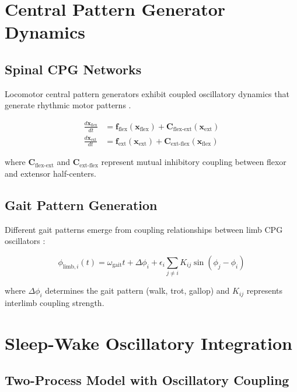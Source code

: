 \documentclass[twocolumn]{article}
\begin{document}
\section{Central Pattern Generator Dynamics}

\subsection{Spinal CPG Networks}

Locomotor central pattern generators exhibit coupled oscillatory dynamics that generate rhythmic motor patterns \citep{grillner2003central,kiehn2016decoding}.

\begin{align}
\frac{d\mathbf{x}_{\text{flex}}}{dt} &= \mathbf{f}_{\text{flex}}(\mathbf{x}_{\text{flex}}) + \mathbf{C}_{\text{flex-ext}}(\mathbf{x}_{\text{ext}}) \label{eq:flexor_cpg} \\
\frac{d\mathbf{x}_{\text{ext}}}{dt} &= \mathbf{f}_{\text{ext}}(\mathbf{x}_{\text{ext}}) + \mathbf{C}_{\text{ext-flex}}(\mathbf{x}_{\text{flex}}) \label{eq:extensor_cpg}
\end{align}

where $\mathbf{C}_{\text{flex-ext}}$ and $\mathbf{C}_{\text{ext-flex}}$ represent mutual inhibitory coupling between flexor and extensor half-centers.

\subsection{Gait Pattern Generation}

Different gait patterns emerge from coupling relationships between limb CPG oscillators \citep{ijspeert2008central}:

\begin{equation}
\phi_{\text{limb},i}(t) = \omega_{\text{gait}} t + \Delta\phi_i + \epsilon_i \sum_{j \neq i} K_{ij} \sin(\phi_j - \phi_i)
\label{eq:gait_coupling}
\end{equation}

where $\Delta\phi_i$ determines the gait pattern (walk, trot, gallop) and $K_{ij}$ represents interlimb coupling strength.

\section{Sleep-Wake Oscillatory Integration}

\subsection{Two-Process Model with Oscillatory Coupling}
\end{document}

